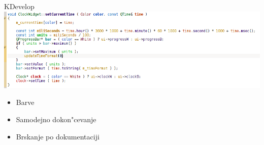 \documentclass{beamer}
\begin{document}
\begin{frame}{KDevelop}
 \includegraphics[width=\textwidth]{./KDE/kdev-color}
  \begin{itemize}
   \item Barve
   \item Samodejno dokon"cevanje
   \item Brskanje po dokumentaciji
  \end{itemize}
\end{frame}
\end{document}
